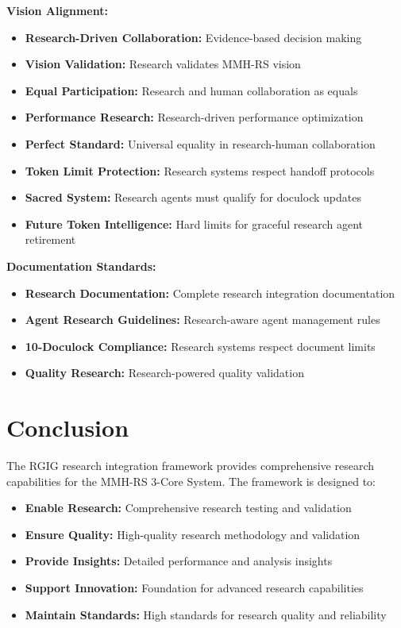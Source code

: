 \documentclass[12pt,a4paper]{article}
\begin{document}
\textbf{Vision Alignment:}
\begin{itemize}
    \item \textbf{Research-Driven Collaboration:} Evidence-based decision making
    \item \textbf{Vision Validation:} Research validates MMH-RS vision
    \item \textbf{Equal Participation:} Research and human collaboration as equals
    \item \textbf{Performance Research:} Research-driven performance optimization
    \item \textbf{Perfect Standard:} Universal equality in research-human collaboration
    \item \textbf{Token Limit Protection:} Research systems respect handoff protocols
    \item \textbf{Sacred System:} Research agents must qualify for doculock updates
    \item \textbf{Future Token Intelligence:} Hard limits for graceful research agent retirement
\end{itemize}

\textbf{Documentation Standards:}
\begin{itemize}
    \item \textbf{Research Documentation:} Complete research integration documentation
    \item \textbf{Agent Research Guidelines:} Research-aware agent management rules
    \item \textbf{10-Doculock Compliance:} Research systems respect document limits
    \item \textbf{Quality Research:} Research-powered quality validation
\end{itemize}

\section{Conclusion}

The RGIG research integration framework provides comprehensive research capabilities for the MMH-RS 3-Core System. The framework is designed to:

\begin{itemize}
    \item \textbf{Enable Research:} Comprehensive research testing and validation
    \item \textbf{Ensure Quality:} High-quality research methodology and validation
    \item \textbf{Provide Insights:} Detailed performance and analysis insights
    \item \textbf{Support Innovation:} Foundation for advanced research capabilities
    \item \textbf{Maintain Standards:} High standards for research quality and reliability
\end{itemize}
\end{document}
